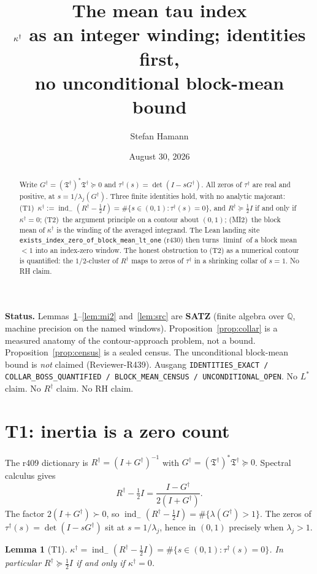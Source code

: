 \documentclass[11pt]{article}
\title{\bfseries The mean tau index\\[2mm]
\large $\kapd$ as an integer winding; identities first,\\
no unconditional block-mean bound}
\author{Stefan Hamann}
\date{August 30, 2026}
\newtheorem{lemma}{Lemma}
\theoremstyle{remark}
\newcommand{\Rd}{R^{\dagger}}
\newcommand{\Td}{\mathfrak{T}^{\dagger}}
\newcommand{\Gd}{G^{\dagger}}
\newcommand{\taud}{\tau^{\dagger}}
\newcommand{\kapd}{\kappa^{\dagger}}
\newcommand{\indm}{\operatorname{ind}_{-}}
\newcommand{\half}{\tfrac12}
\begin{document}
\maketitle

\begin{abstract}\noindent
Write $\Gd=(\Td)^{*}\Td\succeq 0$ and
$\taud(s)=\det(I-s\Gd)$.  All zeros of $\taud$ are real and
positive, at $s=1/\lambda_{j}(\Gd)$.
Three finite identities hold, with no analytic majorant:
(T1)~$\kapd:=\indm(\Rd-\half I)=\#\{s\in(0,1):\taud(s)=0\}$,
and $\Rd\succeq\half I$ if and only if $\kapd=0$;
(T2)~the argument principle on a contour about $(0,1)$;
(MI2)~the block mean of $\kapd$ is the winding of the averaged
integrand.
The Lean landing site
\texttt{exists\_index\_zero\_of\_block\_mean\_lt\_one} (r430)
then turns $\liminf$ of a block mean $<1$ into an index-zero
window.
The honest obstruction to (T2) as a numerical contour is
quantified: the $1/2$-cluster of $\Rd$ maps to zeros of $\taud$
in a shrinking collar of $s=1$.
No RH claim.
\end{abstract}

\medskip\noindent
\textbf{Status.}\enspace
Lemmas~\ref{lem:t1}--\ref{lem:mi2} and~\ref{lem:src} are
\textbf{SATZ} (finite algebra over $\mathbb{Q}$, machine
precision on the named windows).
Proposition~\ref{prop:collar} is a measured anatomy of the
contour-approach problem, not a bound.
Proposition~\ref{prop:census} is a sealed census.
The unconditional block-mean bound is \emph{not} claimed
(Reviewer-R439).
Ausgang
\texttt{IDENTITIES\_EXACT / COLLAR\_BOSS\_QUANTIFIED / BLOCK\_MEAN\_CENSUS / UNCONDITIONAL\_OPEN}.
No $L^{*}$ claim.  No $R^{\dagger}$ claim.  No RH claim.

\section{T1: inertia is a zero count}\label{sec:t1}

The r409 dictionary is $\Rd=(I+\Gd)^{-1}$ with
$\Gd=(\Td)^{*}\Td\succeq 0$.  Spectral calculus gives
\[
\Rd-\half I
=\frac{I-\Gd}{2(I+\Gd)}.
\]
The factor $2(I+\Gd)\succ 0$, so
$\indm(\Rd-\half I)=\#\{\lambda(\Gd)>1\}$.
The zeros of $\taud(s)=\det(I-s\Gd)$ sit at $s=1/\lambda_{j}$,
hence in $(0,1)$ precisely when $\lambda_{j}>1$.

\begin{lemma}[T1]\label{lem:t1}
$\kapd=\indm(\Rd-\half I)=\#\{s\in(0,1):\taud(s)=0\}$.
In particular $\Rd\succeq\half I$ if and only if $\kapd=0$.
\end{lemma}
\end{document}
